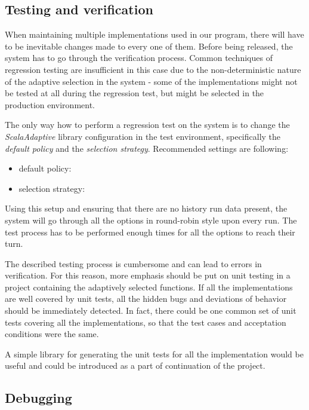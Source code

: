 
\subsection{Testing and verification}

When maintaining multiple implementations used in our program, there will have to be inevitable changes made to every one of them. Before being released, the system has to go through the verification process. Common techniques of regression testing are insufficient in this case due to the non-deterministic nature of the adaptive selection in the system - some of the implementations might not be tested at all during the regression test, but might be selected in the production environment.

The only way how to perform a regression test on the system is to change the \textit{ScalaAdaptive} library configuration in the test environment, specifically the \textit{default policy} and the \textit{selection strategy}. Recommended settings are following:

 \begin{itemize}
 	\item default policy: 
 	\item selection strategy: 
 \end{itemize}

Using this setup and ensuring that there are no history run data present, the system will go through all the options in round-robin style upon every run. The test process has to be performed enough times for all the options to reach their turn.

The described testing process is cumbersome and can lead to errors in verification. For this reason, more emphasis should be put on unit testing in a project containing the adaptively selected functions. If all the implementations are well covered by unit tests, all the hidden bugs and deviations of behavior should be immediately detected. In fact, there could be one common set of unit tests covering all the implementations, so that the test cases and acceptation conditions were the same.

A simple library for generating the unit tests for all the implementation would be useful and could be introduced as a part of continuation of the project.

\subsection{Debugging}

